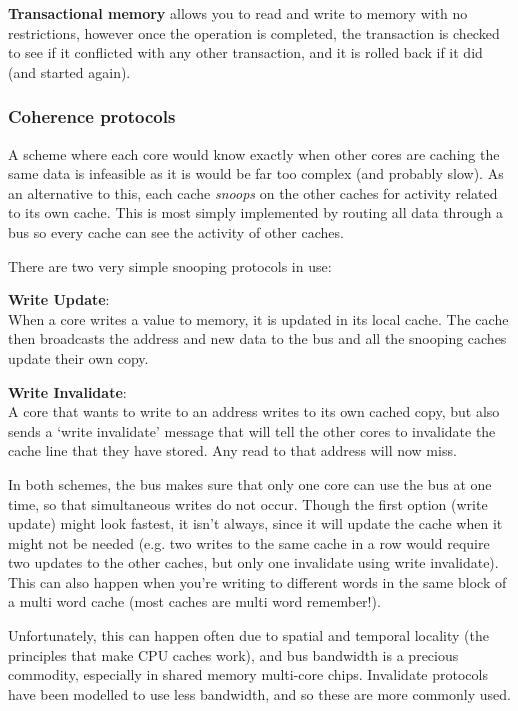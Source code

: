 \textbf{Transactional memory} allows you to read and write to memory with no
restrictions, however once the operation is completed, the transaction is
checked to see if it conflicted with any other transaction, and it is rolled
back if it did (and started again).

\subsubsection{Coherence protocols}
\label{snooping}

A scheme where each core would know exactly when other cores are caching the
same data is infeasible as it is would be far too complex (and probably slow).
As an alternative to this, each cache \textit{snoops} on the other caches for
activity related to its own cache. This is most simply implemented by routing
all data through a bus so every cache can see the activity of other caches.

There are two very simple snooping protocols in use:

\begin{description}
  \item \textbf{Write Update}:\\
    When a core writes a value to memory, it is updated in its local cache. The
    cache then broadcasts the address and new data to the bus and all the
    snooping caches update their own copy.
  \item \textbf{Write Invalidate}:\\
    A core that wants to write to an address writes to its own cached copy, but
    also sends a `write invalidate' message that will tell the other cores
    to invalidate the cache line that they have stored. Any read to that address
    will now miss.
\end{description}

In both schemes, the bus makes sure that only one core can use the bus at one
time, so that simultaneous writes do not occur. Though the first option (write
update) might look fastest, it isn't always, since it will update the cache when
it might not be needed (e.g. two writes to the same cache in a row would require
two updates to the other caches, but only one invalidate using write
invalidate). This can also happen when you're writing to different words in the
same block of a multi word cache (most caches are multi word remember!).

Unfortunately, this can happen often due to spatial and temporal locality (the
principles that make CPU caches work), and bus bandwidth is a precious
commodity, especially in shared memory multi-core chips. Invalidate protocols
have been modelled to use less bandwidth, and so these are more commonly used.


